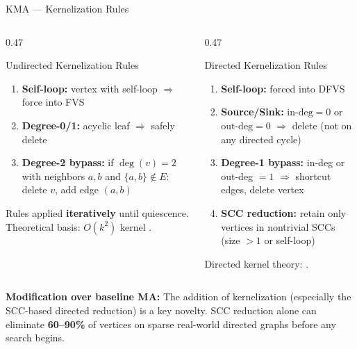\documentclass[aspectratio=169,10pt]{beamer}
\renewcommand{\footnotesize}{\tiny}
\begin{document}
\begin{frame}{KMA — Kernelization Rules}
  \begin{columns}[T]
    \begin{column}{0.47\textwidth}
      \begin{block}{Undirected Kernelization Rules}
        \begin{enumerate}\setlength\itemsep{3pt}
          \item \textbf{Self-loop:} vertex with self-loop $\Rightarrow$ force into FVS
          \item \textbf{Degree-0/1:} acyclic leaf $\Rightarrow$ safely delete
          \item \textbf{Degree-2 bypass:} if $\deg(v)=2$ with neighbors $a,b$
            and $\{a,b\}\notin E$:
            delete $v$, add edge $(a,b)$
        \end{enumerate}
        Rules applied \textbf{iteratively} until quiescence.\\[4pt]
        Theoretical basis: $O(k^2)$ kernel \cite{thomasse2010}.
      \end{block}
    \end{column}
    \begin{column}{0.47\textwidth}
      \begin{block}{Directed Kernelization Rules}
        \begin{enumerate}\setlength\itemsep{3pt}
          \item \textbf{Self-loop:} forced into DFVS
          \item \textbf{Source/Sink:} $\text{in-deg}=0$ or $\text{out-deg}=0$
            $\Rightarrow$ delete (not on any directed cycle)
          \item \textbf{Degree-1 bypass:} in-deg or out-deg $=1$
            $\Rightarrow$ shortcut edges, delete vertex
          \item \textbf{SCC reduction:} retain only vertices in
            nontrivial SCCs (size $>1$ or self-loop)
        \end{enumerate}
        Directed kernel theory: \cite{chen2008dfvs}.
      \end{block}
    \end{column}
  \end{columns}
  \vspace{4pt}
  \begin{tcolorbox}[greenbox,fontupper=\footnotesize]
    \textbf{Modification over baseline MA:} The addition of kernelization
    (especially the SCC-based directed reduction) is a key novelty.
    SCC reduction alone can eliminate \textbf{60--90\%} of vertices
    on sparse real-world directed graphs before any search begins.
  \end{tcolorbox}
\end{frame}
\end{document}
